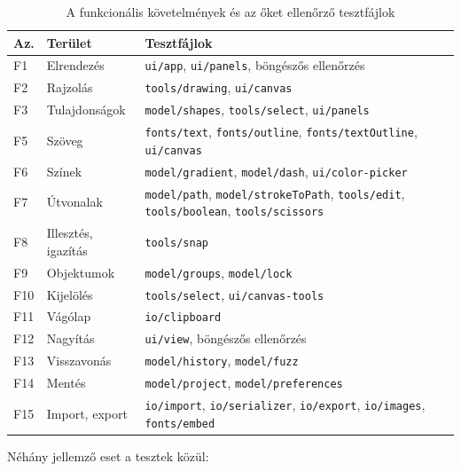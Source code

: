 \begin{table}[!htbp]
\caption{A funkcionális követelmények és az őket ellenőrző tesztfájlok}
\label{tab:req-tests}
\centering
\footnotesize
\renewcommand{\arraystretch}{1.15}
\begin{tabular}{|l|>{\raggedright\arraybackslash}p{}|>{\raggedright\arraybackslash}p{}|}
\hline
\textbf{Az.} & \textbf{Terület} & \textbf{Tesztfájlok} \\ \hline
F1 & Elrendezés & \texttt{ui/app}, \texttt{ui/panels}, böngészős ellenőrzés \\ \hline
F2 & Rajzolás & \texttt{tools/drawing}, \texttt{ui/canvas} \\ \hline
F3 & Tulajdonságok & \texttt{model/shapes}, \texttt{tools/select}, \texttt{ui/panels} \\ \hline
F5 & Szöveg & \texttt{fonts/text}, \texttt{fonts/outline}, \texttt{fonts/textOutline}, \texttt{ui/canvas} \\ \hline
F6 & Színek & \texttt{model/gradient}, \texttt{model/dash}, \texttt{ui/color-picker} \\ \hline
F7 & Útvonalak & \texttt{model/path}, \texttt{model/strokeToPath}, \texttt{tools/edit}, \texttt{tools/boolean}, \texttt{tools/scissors} \\ \hline
F8 & Illesztés, igazítás & \texttt{tools/snap} \\ \hline
F9 & Objektumok & \texttt{model/groups}, \texttt{model/lock} \\ \hline
F10 & Kijelölés & \texttt{tools/select}, \texttt{ui/canvas-tools} \\ \hline
F11 & Vágólap & \texttt{io/clipboard} \\ \hline
F12 & Nagyítás & \texttt{ui/view}, böngészős ellenőrzés \\ \hline
F13 & Visszavonás & \texttt{model/history}, \texttt{model/fuzz} \\ \hline
F14 & Mentés & \texttt{model/project}, \texttt{model/preferences} \\ \hline
F15 & Import, export & \texttt{io/import}, \texttt{io/serializer}, \texttt{io/export}, \texttt{io/images}, \texttt{fonts/embed} \\ \hline
\end{tabular}
\end{table}

\newpage

Néhány jellemző eset a tesztek közül:

